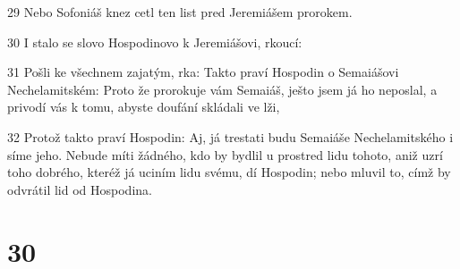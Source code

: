 \par 29 Nebo Sofoniáš knez cetl ten list pred Jeremiášem prorokem.
\par 30 I stalo se slovo Hospodinovo k Jeremiášovi, rkoucí:
\par 31 Pošli ke všechnem zajatým, rka: Takto praví Hospodin o Semaiášovi Nechelamitském: Proto že prorokuje vám Semaiáš, ješto jsem já ho neposlal, a privodí vás k tomu, abyste doufání skládali ve lži,
\par 32 Protož takto praví Hospodin: Aj, já trestati budu Semaiáše Nechelamitského i síme jeho. Nebude míti žádného, kdo by bydlil u prostred lidu tohoto, aniž uzrí toho dobrého, kteréž já uciním lidu svému, dí Hospodin; nebo mluvil to, címž by odvrátil lid od Hospodina.

\chapter{30}

